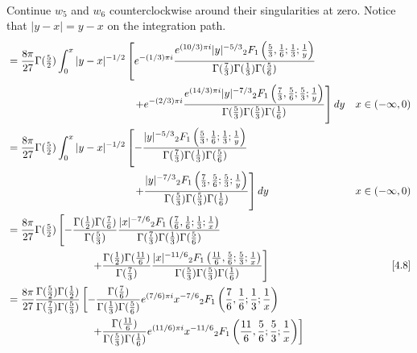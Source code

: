 \documentclass[11pt,a4paper,twoside,leqno,noamsfonts]{amsart}
\numberwithin{equation}{section}
\begin{document}
\begin{example}[Airy]
{\begin{align*}
\end{align*}
Continue $w_5$ and $w_6$ counterclockwise around their singularities at zero.} Notice that $|y - x| = y - x$ on the integration path.
\begin{align*}
&=\frac{8\pi}{27} \Gamma(\tfrac{5}{2}) \int_0^x |y-x|^{-1/2}\left[ e^{-(1/3) \pi i} \frac{e^{(10/3) \pi i} |y|^{-5/3} {}_2F_1\left(\frac{5}{3},\frac{1}{6};\frac{1}{3};\frac{1}{y}\right)}{\Gamma(\tfrac{7}{3}) \Gamma(\tfrac{1}{3}) \Gamma(\tfrac{5}{6})} \right. \\
& \qquad\qquad\qquad\qquad\qquad\qquad \left. + e^{-(2/3) \pi i} \frac{e^{(14/3) \pi i} |y|^{-7/3} {}_2F_1\left(\frac{7}{3},\frac{5}{6};\frac{5}{3};\frac{1}{y}\right)}{\Gamma(\tfrac{5}{3}) \Gamma(\tfrac{5}{3}) \Gamma(\tfrac{1}{6})} \right]dy & x\in (-\infty,0) \\
&=\frac{8\pi}{27} \Gamma(\tfrac{5}{2}) \int_0^x |y-x|^{-1/2}\left[ -\frac{|y|^{-5/3} {}_2F_1\left(\frac{5}{3},\frac{1}{6};\frac{1}{3};\frac{1}{y}\right)}{\Gamma(\tfrac{7}{3}) \Gamma(\tfrac{1}{3}) \Gamma(\tfrac{5}{6})} \right. \\
& \qquad\qquad\qquad\qquad\qquad\qquad \left. + \frac{|y|^{-7/3} {}_2F_1\left(\frac{7}{3},\frac{5}{6};\frac{5}{3};\frac{1}{y}\right)}{\Gamma(\tfrac{5}{3}) \Gamma(\tfrac{5}{3}) \Gamma(\tfrac{1}{6})} \right]dy & x\in (-\infty,0) \\
&=\frac{8\pi}{27} \Gamma(\tfrac{5}{2}) \left[ -\frac{\Gamma(\tfrac{1}{2}) \Gamma(\tfrac{7}{6})}{\Gamma(\tfrac{5}{3})} \frac{|x|^{-7/6} {}_2F_1\left(\frac{7}{6},\frac{1}{6};\frac{1}{3};\frac{1}{x}\right)}{\Gamma(\tfrac{7}{3}) \Gamma(\tfrac{1}{3}) \Gamma(\tfrac{5}{6})} \right. \\
& \qquad\qquad\qquad\qquad \left. + \frac{\Gamma(\tfrac{1}{2}) \Gamma(\tfrac{11}{6})}{\Gamma(\tfrac{7}{3})} \frac{|x|^{-11/6} {}_2F_1\left(\frac{11}{6},\frac{5}{6};\frac{5}{3};\frac{1}{x}\right)}{\Gamma(\tfrac{5}{3}) \Gamma(\tfrac{5}{3}) \Gamma(\tfrac{1}{6})} \right] & \eqref{4.8} \\
&=\frac{8\pi}{27} \frac{\Gamma(\tfrac{5}{2}) \Gamma(\tfrac{1}{2})}{\Gamma(\tfrac{7}{3}) \Gamma(\tfrac{5}{3})} \left[ -\frac{\Gamma(\tfrac{7}{6})}{\Gamma(\tfrac{1}{3}) \Gamma(\tfrac{5}{6})} e^{(7/6) \pi i} x^{-7/6} {}_2F_1\left(\frac{7}{6},\frac{1}{6};\frac{1}{3};\frac{1}{x}\right) \right. \\
& \left. \qquad\qquad\qquad\qquad + \frac{\Gamma(\tfrac{11}{6})}{\Gamma(\tfrac{5}{3}) \Gamma(\tfrac{1}{6})} e^{(11/6) \pi i} x^{-11/6} {}_2F_1\left(\frac{11}{6},\frac{5}{6};\frac{5}{3};\frac{1}{x}\right) \right] \\

\end{align*}
\end{example}
\end{document}
